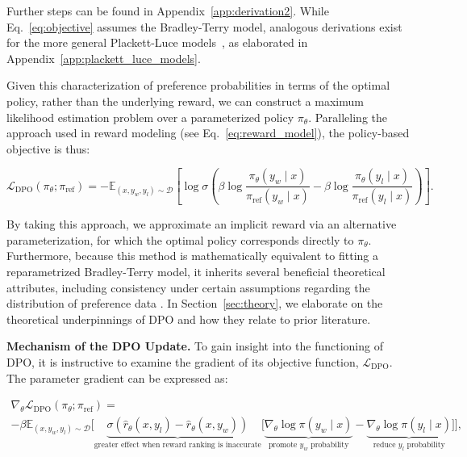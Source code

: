 Further steps can be found in Appendix~\ref{app:derivation2}. While Eq.~\ref{eq:objective} assumes the Bradley-Terry model, analogous derivations exist for the more general Plackett-Luce models~\citep{plackett1975analysis, luce2012individual}, as elaborated in Appendix~\ref{app:plackett_luce_models}.

Given this characterization of preference probabilities in terms of the optimal policy, rather than the underlying reward, we can construct a maximum likelihood estimation problem over a parameterized policy $\pi_\theta$. Paralleling the approach used in reward modeling (see Eq.~\ref{eq:reward_model}), the policy-based objective is thus:

\begin{equation}\label{eq:optimum_model}
    \mathcal{L}_\text{DPO}(\pi_{\theta}; \pi_\text{ref}) = -\mathbb{E}_{(x, y_w, y_l)\sim \mathcal{D}}\left[\log \sigma \left(\beta \log \frac{\pi_{\theta}(y_w\mid x)}{\pi_\text{ref}(y_w\mid x)} - \beta \log \frac{\pi_{\theta}(y_l\mid x)}{\pi_\text{ref}(y_l\mid x)}\right)\right].
\end{equation}

By taking this approach, we approximate an implicit reward via an alternative parameterization, for which the optimal policy corresponds directly to $\pi_\theta$. Furthermore, because this method is mathematically equivalent to fitting a reparametrized Bradley-Terry model, it inherits several beneficial theoretical attributes, including consistency under certain assumptions regarding the distribution of preference data \cite{bong2022generalized}. In Section~\ref{sec:theory}, we elaborate on the theoretical underpinnings of DPO and how they relate to prior literature.

\textbf{Mechanism of the DPO Update.} To gain insight into the functioning of DPO, it is instructive to examine the gradient of its objective function, $\mathcal{L}_\text{DPO}$. The parameter gradient can be expressed as:

\begin{multline*}\label{eq:gradient}
    \nabla_\theta \mathcal{L}_\text{DPO}(\pi_\theta;\pi_\text{ref}) = \\ -\beta\mathbb{E}_{(x, y_w, y_l) \sim \mathcal{D}} \bigg[\underbrace{\sigma(\hat{r}_\theta(x, y_l) - \hat{r}_\theta (x, y_w))}_\text{greater effect when reward ranking is inaccurate}\bigg[\underbrace{\nabla_\theta\log \pi(y_w \mid x)}_\text{promote $y_w$ probability} - \underbrace{\nabla_\theta\log\pi(y_l \mid x)}_\text{reduce $y_l$ probability}\bigg]\bigg],
\end{multline*}

